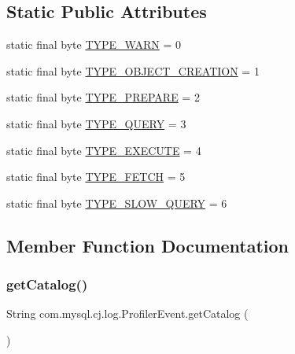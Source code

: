 \subsection*{Static Public Attributes}
\begin{DoxyCompactItemize}
\item 
static final byte \mbox{\hyperlink{interfacecom_1_1mysql_1_1cj_1_1log_1_1_profiler_event_a4ff21bb750ed44ba95fde3550f73c9df}{T\+Y\+P\+E\+\_\+\+W\+A\+RN}} = 0
\item 
static final byte \mbox{\hyperlink{interfacecom_1_1mysql_1_1cj_1_1log_1_1_profiler_event_aa1502875ad8a1457d6b8425927632686}{T\+Y\+P\+E\+\_\+\+O\+B\+J\+E\+C\+T\+\_\+\+C\+R\+E\+A\+T\+I\+ON}} = 1
\item 
static final byte \mbox{\hyperlink{interfacecom_1_1mysql_1_1cj_1_1log_1_1_profiler_event_aa10357d26557c773685cb022df5c06d0}{T\+Y\+P\+E\+\_\+\+P\+R\+E\+P\+A\+RE}} = 2
\item 
static final byte \mbox{\hyperlink{interfacecom_1_1mysql_1_1cj_1_1log_1_1_profiler_event_af882393e5efbaccca534c2cf8f5b4b1b}{T\+Y\+P\+E\+\_\+\+Q\+U\+E\+RY}} = 3
\item 
static final byte \mbox{\hyperlink{interfacecom_1_1mysql_1_1cj_1_1log_1_1_profiler_event_aedf5d4b8edd977d032ecc2b3691568fb}{T\+Y\+P\+E\+\_\+\+E\+X\+E\+C\+U\+TE}} = 4
\item 
static final byte \mbox{\hyperlink{interfacecom_1_1mysql_1_1cj_1_1log_1_1_profiler_event_a2d7e9650590c5fc5048ec9a289f46f8b}{T\+Y\+P\+E\+\_\+\+F\+E\+T\+CH}} = 5
\item 
static final byte \mbox{\hyperlink{interfacecom_1_1mysql_1_1cj_1_1log_1_1_profiler_event_ab023b1698e603e56e18f18e0f929e0b7}{T\+Y\+P\+E\+\_\+\+S\+L\+O\+W\+\_\+\+Q\+U\+E\+RY}} = 6
\end{DoxyCompactItemize}


\subsection{Member Function Documentation}
\mbox{\label{interfacecom_1_1mysql_1_1cj_1_1log_1_1_profiler_event_a234f6be623335bd2510e74220d71c526}} 
\subsubsection{\texorpdfstring{get\+Catalog()}{getCatalog()}}
{\footnotesize\ttfamily String com.\+mysql.\+cj.\+log.\+Profiler\+Event.\+get\+Catalog (\begin{DoxyParamCaption}{ }\end{DoxyParamCaption})}

